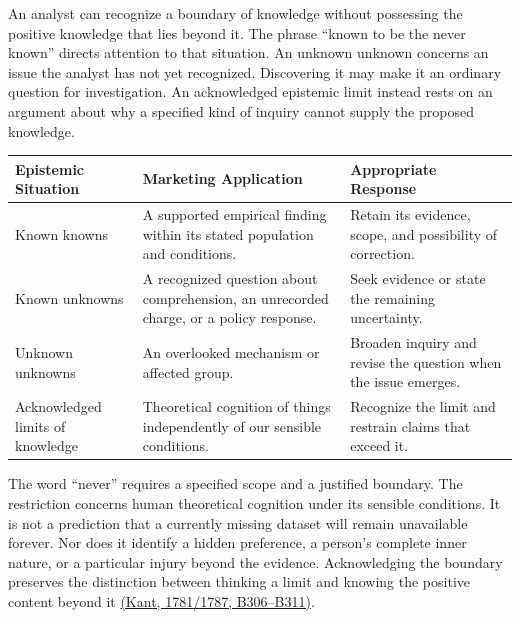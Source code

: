 \noindent \noindent An analyst can recognize a boundary of knowledge without
possessing the positive knowledge that lies beyond it. The phrase
``known to be the never known'' directs attention to that situation. An
unknown unknown concerns an issue the analyst has not yet recognized.
Discovering it may make it an ordinary question for investigation. An
acknowledged epistemic limit instead rests on an argument about why a
specified kind of inquiry cannot supply the proposed knowledge.

\begin{table}[H]
\centering\small
\begin{tabular}{@{}
  >{\raggedright\arraybackslash}p{}
  >{\raggedright\arraybackslash}p{}
  >{\raggedright\arraybackslash}p{}@{}}
\toprule
Epistemic Situation & Marketing Application & Appropriate Response \\
\midrule

Known knowns & A supported empirical finding within its stated
population and conditions. & Retain its evidence, scope, and possibility
of correction. \\
Known unknowns & A recognized question about comprehension, an
unrecorded charge, or a policy response. & Seek evidence or state the
remaining uncertainty. \\
Unknown unknowns & An overlooked mechanism or affected group. & Broaden
inquiry and revise the question when the issue emerges. \\
Acknowledged limits of knowledge & Theoretical cognition of things
independently of our sensible conditions. & Recognize the limit and
restrain claims that exceed it. \\
\bottomrule
\end{tabular}
\end{table}

The word ``never'' requires a specified scope and a justified boundary.
The restriction concerns human theoretical cognition under its sensible
conditions. It is not a prediction that a currently missing dataset will
remain unavailable forever. Nor does it identify a hidden preference, a
person's complete inner nature, or a particular injury beyond the
evidence. Acknowledging the boundary preserves the distinction between
thinking a limit and knowing the positive content beyond it
\href{../01_Resources/15_Marketing_Dialectics/01_Kant_Primary_Texts/public_domain_texts/Kant_CritiqueOfPureReason_Meiklejohn1855.html}{(Kant,
1781/1787, B306--B311)}.

